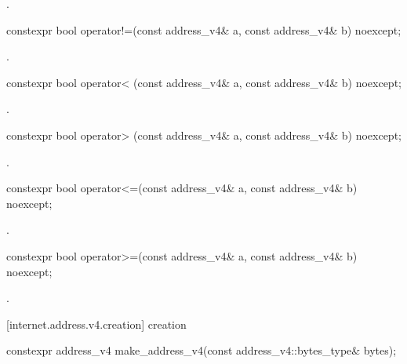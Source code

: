 \begin{itemdescr}
\pnum
\returns {}.
\end{itemdescr}

\begin{itemdecl}
constexpr bool operator!=(const address_v4& a, const address_v4& b) noexcept;
\end{itemdecl}

\begin{itemdescr}
\pnum
\returns {}.
\end{itemdescr}

\begin{itemdecl}
constexpr bool operator< (const address_v4& a, const address_v4& b) noexcept;
\end{itemdecl}

\begin{itemdescr}
\pnum
\returns {}.
\end{itemdescr}

\begin{itemdecl}
constexpr bool operator> (const address_v4& a, const address_v4& b) noexcept;
\end{itemdecl}

\begin{itemdescr}
\pnum
\returns {}.
\end{itemdescr}

\begin{itemdecl}
constexpr bool operator<=(const address_v4& a, const address_v4& b) noexcept;
\end{itemdecl}

\begin{itemdescr}
\pnum
\returns {}.
\end{itemdescr}

\begin{itemdecl}
constexpr bool operator>=(const address_v4& a, const address_v4& b) noexcept;
\end{itemdecl}

\begin{itemdescr}
\pnum
\returns {}.
\end{itemdescr}



[internet.address.v4.creation]{ creation}

\begin{itemdecl}
constexpr address_v4 make_address_v4(const address_v4::bytes_type& bytes);
\end{itemdecl}

